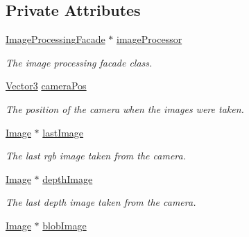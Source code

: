 \subsection*{Private Attributes}
\begin{DoxyCompactItemize}
\item 
\mbox{\label{classFindRobot_a009faddfec003a049608fb535521c09f}} 
\hyperlink{classImageProcessingFacade}{Image\+Processing\+Facade} $\ast$ \hyperlink{classFindRobot_a009faddfec003a049608fb535521c09f}{image\+Processor}
\begin{DoxyCompactList}\small\item\em The image processing facade class. \end{DoxyCompactList}\item 
\mbox{\label{classFindRobot_a68e82ba1b2ef89dd1a767e917b70bf2a}} 
\hyperlink{classVector3}{Vector3} \hyperlink{classFindRobot_a68e82ba1b2ef89dd1a767e917b70bf2a}{camera\+Pos}
\begin{DoxyCompactList}\small\item\em The position of the camera when the images were taken. \end{DoxyCompactList}\item 
\mbox{\label{classFindRobot_a1c53be1c0b13581f8fe833090776cc21}} 
\hyperlink{classImage}{Image} $\ast$ \hyperlink{classFindRobot_a1c53be1c0b13581f8fe833090776cc21}{last\+Image}
\begin{DoxyCompactList}\small\item\em The last rgb image taken from the camera. \end{DoxyCompactList}\item 
\mbox{\label{classFindRobot_a8560b99cd1110bb459af3d862b3695a3}} 
\hyperlink{classImage}{Image} $\ast$ \hyperlink{classFindRobot_a8560b99cd1110bb459af3d862b3695a3}{depth\+Image}
\begin{DoxyCompactList}\small\item\em The last depth image taken from the camera. \end{DoxyCompactList}\item 
\mbox{\label{classFindRobot_ab57facf1a4ca4ae4a52c088d45949a41}} 
\hyperlink{classImage}{Image} $\ast$ \hyperlink{classFindRobot_ab57facf1a4ca4ae4a52c088d45949a41}{blob\+Image}

\end{DoxyCompactItemize}
